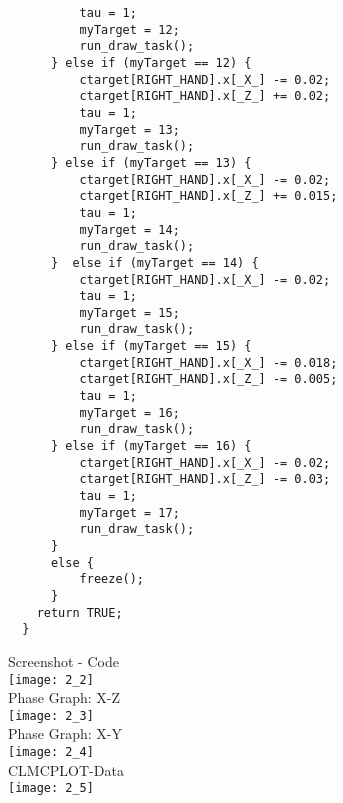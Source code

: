 \documentclass[12pt]{article}
\begin{document}
\begin{Answer}
\begin{verbatim}
          tau = 1;
          myTarget = 12;
          run_draw_task();
      } else if (myTarget == 12) {
          ctarget[RIGHT_HAND].x[_X_] -= 0.02;
          ctarget[RIGHT_HAND].x[_Z_] += 0.02;
          tau = 1;
          myTarget = 13;
          run_draw_task();
      } else if (myTarget == 13) {
          ctarget[RIGHT_HAND].x[_X_] -= 0.02;
          ctarget[RIGHT_HAND].x[_Z_] += 0.015;
          tau = 1;
          myTarget = 14;
          run_draw_task();
      }  else if (myTarget == 14) {
          ctarget[RIGHT_HAND].x[_X_] -= 0.02;
          tau = 1;
          myTarget = 15;
          run_draw_task();
      } else if (myTarget == 15) {
          ctarget[RIGHT_HAND].x[_X_] -= 0.018;
          ctarget[RIGHT_HAND].x[_Z_] -= 0.005;
          tau = 1;
          myTarget = 16;
          run_draw_task();
      } else if (myTarget == 16) {
          ctarget[RIGHT_HAND].x[_X_] -= 0.02;
          ctarget[RIGHT_HAND].x[_Z_] -= 0.03;
          tau = 1;
          myTarget = 17;
          run_draw_task();
      }
      else {
          freeze();
      }
    return TRUE; 
  }
\end{verbatim}
\clearpage
Screenshot - Code\\
\texttt{[image: 2\_2]}\\

\clearpage
Phase Graph: X-Z\\
\texttt{[image: 2\_3]}\\

Phase Graph: X-Y\\
\texttt{[image: 2\_4]}\\

\clearpage
CLMCPLOT-Data\\
\texttt{[image: 2\_5]}\\

\end{Answer}
\end{document}
